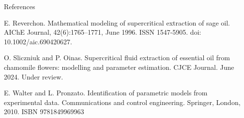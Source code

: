 \documentclass[a0,portrait]{a0poster}
\begin{document}
\begin{multicols}{2}
\begin{tcolorbox}[width=\linewidth, boxrule=0mm, sharp corners=all, colback=white]
\end{tcolorbox}




\begin{tcolorbox}[width=\linewidth, boxrule=0mm, sharp corners=all, colback=white]
	{\LARGE References\\}
	\begin{enumerate}[label={[\arabic*]}]
		\item E. Reverchon. Mathematical modeling of supercritical extraction of sage oil. AIChE Journal, 42(6):1765–1771, June 1996. ISSN 1547-5905. doi: 10.1002/aic.690420627.
		\item O. Sliczniuk and P. Oinas. Supercritical fluid extraction of essential oil from chamomile flowers: modelling and parameter estimation. CJCE Journal. June 2024. Under review.
		\item E. Walter and L. Pronzato. Identification of parametric models from experimental data. Communications and control engineering. Springer, London, 2010. ISBN 9781849969963
	\end{enumerate}
\end{tcolorbox}




\end{multicols}
\end{document}
